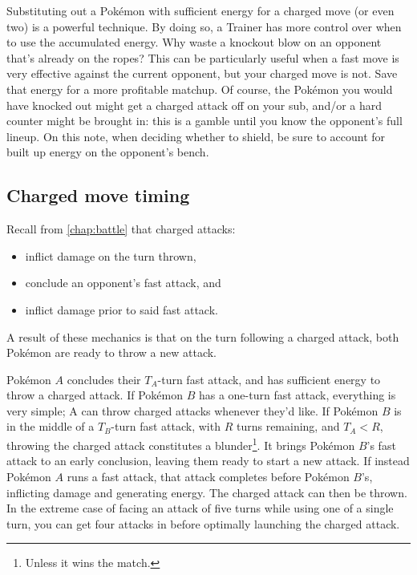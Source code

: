 Substituting out a Pokémon with sufficient energy for a charged move (or even two) is a powerful technique.
By doing so, a Trainer has more control over when to use the accumulated energy.
Why waste a knockout blow on an opponent that's already on the ropes?
This can be particularly useful when a fast move is very effective against the current opponent,
 but your charged move is not.
Save that energy for a more profitable matchup.
Of course, the Pokémon you would have knocked out might get a charged attack off on your sub,
 and/or a hard counter might be brought in:
 this is a gamble until you know the opponent's full lineup.
On this note, when deciding whether to shield, be sure to account for built up energy on the opponent's bench.

\subsection{Charged move timing\label{subsec:cmt}}
Recall from \autoref{chap:battle} that charged attacks:
\begin{itemize}
\item inflict damage on the turn thrown,
\item conclude an opponent's fast attack, and
\item inflict damage prior to said fast attack.
\end{itemize}
A result of these mechanics is that on the turn following a charged attack,
 both Pokémon are ready to throw a new attack.

Pokémon $A$ concludes their $T_A$-turn fast attack, and has sufficient energy to throw a charged attack.
If Pokémon $B$ has a one-turn fast attack, everything is very simple;
 A can throw charged attacks whenever they'd like.
If Pokémon $B$ is in the middle of a $T_B$-turn fast attack, with $R$ turns remaining,
 and $T_A < R$, throwing the charged attack constitutes a blunder\footnote{Unless it wins the match.}.
It brings Pokémon $B$'s fast attack to an early conclusion, leaving them ready to start a new attack.
If instead Pokémon $A$ runs a fast attack, that attack completes before Pokémon $B$'s, inflicting damage and generating energy.
The charged attack can then be thrown.
In the extreme case of facing an attack of five turns while using one of a single turn,
  you can get four attacks in before optimally launching the charged attack.


